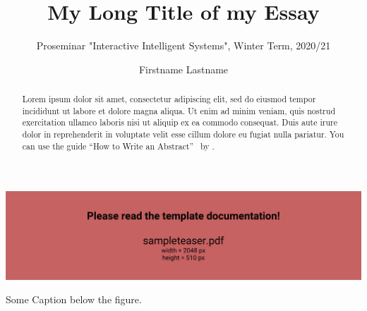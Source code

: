 \documentclass[sigchi]{acmart}
\makeatletter
\newcommand{\myLongTitle}{My Long Title of my Essay} %
\newcommand{\myShortTitle}{Short Title of Essay} %
\makeatother
\begin{document}
\title{\myLongTitle{}}

\subtitle{Proseminar "Interactive Intelligent Systems", Winter Term, 2020/21}

\author{Firstname Lastname} %

\renewcommand{\shortauthors}{F. Lastname - \myShortTitle{}} %


\begin{abstract}
  Lorem ipsum dolor sit amet, consectetur adipiscing elit, sed do eiusmod tempor incididunt ut labore et dolore magna aliqua. Ut enim ad minim veniam, quis nostrud exercitation ullamco laboris nisi ut aliquip ex ea commodo consequat. Duis aute irure dolor in reprehenderit in voluptate velit esse cillum dolore eu fugiat nulla pariatur. You can use the guide ``How to Write an Abstract''~\cite{howToabstract1997} by \citeauthor{howToabstract1997}.
\end{abstract}


\begin{teaserfigure}
  \includegraphics[width=\textwidth]{sampleteaser}
  \caption{Some Caption below the figure.}
  \label{fig:teaser}
\end{teaserfigure}
\end{document}
